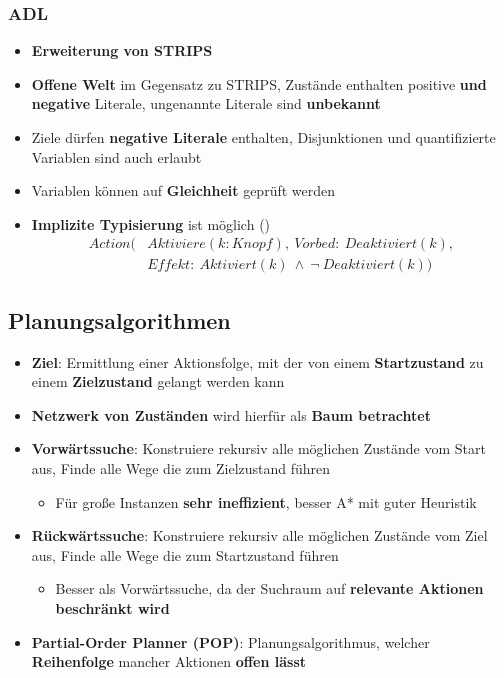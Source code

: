 \subsubsection{ADL}%
\label{plan:ssub:adl}

\begin{itemize}
	\item \textbf{Erweiterung von STRIPS}
	\item \textbf{Offene Welt} im Gegensatz zu STRIPS, Zustände enthalten positive \textbf{und negative} Literale, ungenannte Literale sind \textbf{unbekannt}
	\item Ziele dürfen \textbf{negative Literale} enthalten, Disjunktionen und quantifizierte Variablen sind auch erlaubt
	\item Variablen können auf \textbf{Gleichheit} geprüft werden
	\item \textbf{Implizite Typisierung} ist möglich ()
	\begin{align*}
		Action(&Aktiviere(k: Knopf),\ Vorbed:\ Deaktiviert(k),\\ &Effekt:\ Aktiviert(k)\ \land\ \neg\ Deaktiviert(k))
	\end{align*}
\end{itemize}

\newpage
\subsection{Planungsalgorithmen}%
\label{plan:sub:planungsalgorithmen}

\begin{itemize}
	\item \textbf{Ziel}: Ermittlung einer Aktionsfolge, mit der von einem \textbf{Startzustand} zu einem \textbf{Zielzustand} gelangt werden kann
	\item \textbf{Netzwerk von Zuständen} wird hierfür als \textbf{Baum betrachtet}
	\item \textbf{Vorwärtssuche}: Konstruiere rekursiv alle möglichen Zustände vom Start aus, Finde alle Wege die zum Zielzustand führen
	\begin{itemize}
		\item Für große Instanzen \textbf{sehr ineffizient}, besser A* mit guter Heuristik
	\end{itemize}
	\item \textbf{Rückwärtssuche}: Konstruiere rekursiv alle möglichen Zustände vom Ziel aus, Finde alle Wege die zum Startzustand führen
	\begin{itemize}
		\item Besser als Vorwärtssuche, da der Suchraum auf \textbf{relevante Aktionen beschränkt wird}
	\end{itemize}
	\item \textbf{Partial-Order Planner (POP)}: Planungsalgorithmus, welcher \textbf{Reihenfolge} mancher Aktionen \textbf{offen lässt}
\end{itemize}

